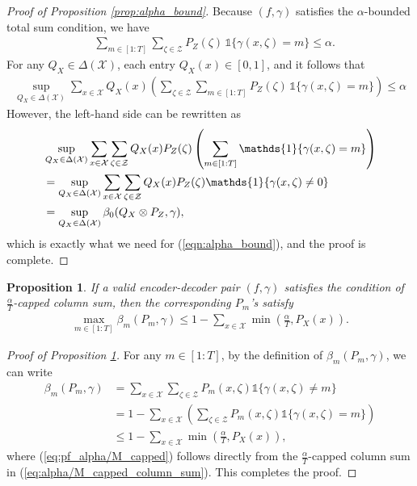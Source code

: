 \documentclass[11pt,letterpaper]{article}
\newtheorem{prop}{\textbf{Proposition}}
\newcommand{\cX}{\mathcal{X}}
\newcommand{\cZ}{\mathcal{Z}}
\begin{document}
\begin{proof}[Proof of Proposition \ref{prop:alpha_bound}]
Because $(f,\gamma)$ satisfies the $\alpha$-bounded total sum condition, we have
\begin{align}
    & \sum_{m\in[1:T]} \sum_{\zeta \in \cZ} P_{Z}(\zeta)\,\mathds{1}\{\gamma(x,\zeta)=m\} \leq \alpha. 
\end{align}
For any $Q_X \in \Delta(\cX)$, each entry $Q_X(x)\in[0,1]$, and it follows that
\begin{align}
    \sup_{Q_X \in \Delta(\cX)} \sum_{x \in \cX} Q_X(x)\left(\sum_{\zeta \in \cZ}\sum_{m\in[1:T]}  P_{Z}(\zeta)\,\mathds{1}\{\gamma(x,\zeta)=m\} \right)\leq \alpha
\end{align}
However, the left-hand side can be rewritten as
\begin{align}
&\sup_{Q_X \in \Delta(\cX)} \sum_{x \in \cX}  \sum_{\zeta \in \cZ}Q_X(x)P_{Z}(\zeta) \left( \sum_{m\in[1:T]}\mathds{1}\{\gamma(x,\zeta)=m\} \right)\notag\\
    &=\sup_{Q_X \in \Delta(\cX)} \sum_{x \in \cX}\sum_{\zeta \in \cZ}Q_X(x)P_{Z}(\zeta) \mathds{1}\{\gamma(x,\zeta)\neq 0\}\notag\\
    &=\sup_{Q_X \in \Delta(\cX)} \beta_0 (Q_X\otimes P_Z,\gamma),
\label{eq:pf_prop_alpha_bound_goal} 
\end{align}
which is exactly what we need for (\ref{eqn:alpha_bound}), and the proof is complete.
\end{proof}

\begin{prop} \label{prop:alpha/T-capped}
    If a valid encoder-decoder pair $(f,\gamma)$ satisfies the condition of $\frac{\alpha}{T}$-capped column sum, then the corresponding $P_m$'s satisfy
    \begin{align}
    \max_{m\in [1:T]}\beta_m(P_m, \gamma)\leq 1 - \sum_{x\in \cX} \min\left(\tfrac{\alpha}{T}, P_X(x)\right).
    \end{align}
\end{prop}

\begin{proof}[Proof of Proposition \ref{prop:alpha/T-capped}]
For any $m \in [1:T] $, by the definition of $\beta_m(P_m, \gamma)$, we can write 
\begin{align}
    \beta_m(P_m, \gamma) & = \sum_{x\in \cX} \sum_{ \zeta \in \cZ} P_m(x,\zeta)\mathds{1}\{\gamma(x,\zeta) \neq m \} \\
    & = 1 - \sum_{x\in \cX} \left( \sum_{ \zeta \in \cZ}  P_m(x,\zeta)\mathds{1}\{\gamma(x,\zeta) = m \} \right) \\
    & \leq 1- \sum_{x\in \cX} \min(\frac{\alpha}{T}, P_X(x)), \label{eq:pf_alpha/M_capped}
\end{align}
where (\ref{eq:pf_alpha/M_capped}) follows directly from the $\frac{\alpha}{T}$-capped column sum in (\ref{eq:alpha/M_capped_column_sum}). This completes the proof.
\end{proof}
\end{document}
